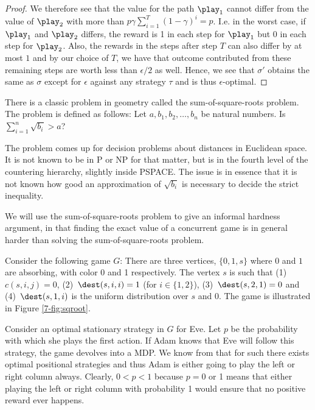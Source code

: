 \begin{proof}
We therefore see that the value for the path $\play_1$ cannot differ from the value of $\play_2$ with more than $p\gamma\sum_{i=1}^T(1-\gamma)^i=p$. I.e. in the worst case, if $\play_1$ and $\play_2$ differs, the reward is 1 in each step for $\play_1$ but 0 in each step for $\play_2$.
Also, the rewards in the steps after step $T$ can also differ by at most $1$ and by our choice of $T$, we have that outcome contributed from these remaining steps are worth less than $\epsilon/2$ as well.
Hence, we see that $\sigma'$ obtains the same as $\sigma$ except for $\epsilon$ against any strategy $\tau$ and is thus $\epsilon$-optimal.













\end{proof}

There is a classic problem in geometry called the sum-of-square-roots problem. The problem is defined as follows:
Let $a,b_1,b_2,\dots,b_n$ be natural numbers. Is $\sum_{i=1}^n\sqrt{b_i}>a$? 

The problem comes up for decision problems about distances in Euclidean space. It is not known to be in P or NP for that matter, but is in the fourth level of the countering hierarchy, slightly inside PSPACE. The issue is in essence that it is not known how good an approximation of $\sqrt{b_i}$ is necessary to decide the strict inequality. 

We will use the sum-of-square-roots problem to give an informal hardness argument, in that finding the exact value of a concurrent game is in general harder than solving the sum-of-square-roots problem. 

Consider the following game $G$:
There are three vertices, $\{0,1,s\}$ where $0$ and $1$ are absorbing, with color 0 and 1 respectively.
The vertex $s$ is such that (1)~$c(s,i,j)=0$, (2)~$\dest(s,i,i)=1$ (for $i\in \{1,2\}$), (3)~$\dest(s,2,1)=0$ and (4)~$\dest(s,1,i)$ is the uniform distribution over $s$ and $0$. The game is illustrated in Figure \ref{7-fig:sqroot}.

Consider an optimal stationary strategy in $G$ for Eve. Let $p$ be the probability with which she plays the first action. If Adam knows that Eve will follow this strategy, the game devolves into a MDP. We know from that for such there exists optimal positional strategies and thus Adam is either going to play the left or right column always. Clearly, $0<p<1$ because $p=0$ or 1 means that either playing the left or right column with probability 1 would ensure that no positive reward ever happens.


